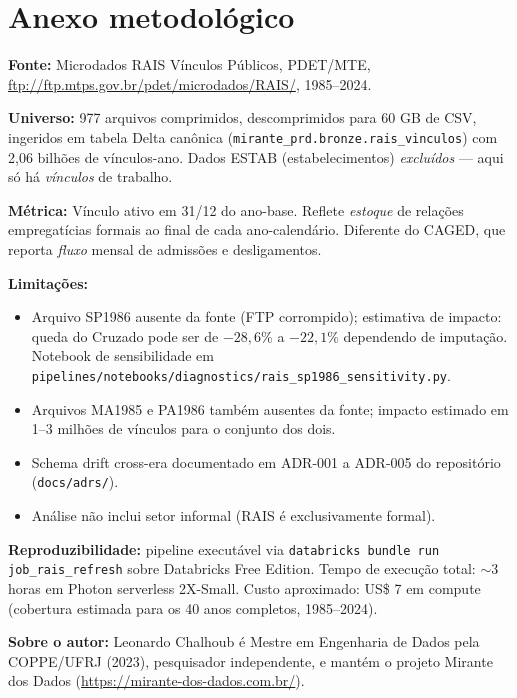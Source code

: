 \documentclass[12pt,a4paper,oneside]{article}
\begin{document}
\section*{Anexo metodológico}

\textbf{Fonte:} Microdados RAIS Vínculos Públicos, PDET/MTE,
\url{ftp://ftp.mtps.gov.br/pdet/microdados/RAIS/}, 1985--2024.

\textbf{Universo:} 977 arquivos comprimidos, descomprimidos para 60 GB
de CSV, ingeridos em tabela Delta canônica (\texttt{mirante\_prd.bronze.rais\_vinculos})
com 2{,}06 bilhões de vínculos-ano. Dados ESTAB (estabelecimentos)
\textit{excluídos} --- aqui só há \textit{vínculos} de trabalho.

\textbf{Métrica:} Vínculo ativo em 31/12 do ano-base. Reflete
\textit{estoque} de relações empregatícias formais ao final de cada
ano-calendário. Diferente do CAGED, que reporta \textit{fluxo} mensal
de admissões e desligamentos.

\textbf{Limitações:}
\begin{itemize}
  \item Arquivo SP1986 ausente da fonte (FTP corrompido); estimativa
        de impacto: queda do Cruzado pode ser de $-28{,}6\%$ a
        $-22{,}1\%$ dependendo de imputação. Notebook de sensibilidade
        em \texttt{pipelines/notebooks/diagnostics/rais\_sp1986\_sensitivity.py}.
  \item Arquivos MA1985 e PA1986 também ausentes da fonte; impacto
        estimado em 1--3 milhões de vínculos para o conjunto dos dois.
  \item Schema drift cross-era documentado em ADR-001 a ADR-005 do
        repositório (\texttt{docs/adrs/}).
  \item Análise não inclui setor informal (RAIS é exclusivamente formal).
\end{itemize}

\textbf{Reproduzibilidade:} pipeline executável via
\texttt{databricks bundle run job\_rais\_refresh} sobre Databricks
Free Edition. Tempo de execução total: $\sim$3 horas em Photon
serverless 2X-Small. Custo aproximado: US\$ 7 em compute (cobertura
estimada para os 40 anos completos, 1985--2024).

\textbf{Sobre o autor:} Leonardo Chalhoub é Mestre em Engenharia de
Dados pela COPPE/UFRJ (2023), pesquisador independente, e mantém o
projeto Mirante dos Dados (\url{https://mirante-dos-dados.com.br/}).
\end{document}
